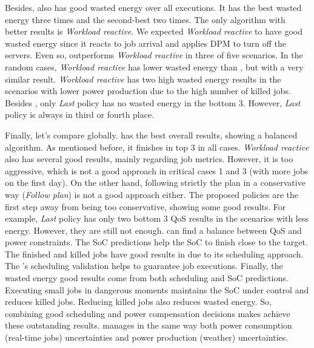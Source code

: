 Besides, \emph{\systemName} also has good wasted energy over all executions. It has the best wasted energy three times and the second-best two times. The only algorithm with better results is \emph{Workload reactive}. We expected \emph{Workload reactive} to have good wasted energy since it reacts to job arrival and applies DPM to turn off the servers. Even so, \emph{\systemName} outperforms \emph{Workload reactive} in three of five scenarios. In the random cases, \emph{Workload reactive} has lower wasted energy than \emph{\systemName}, but with a very similar result. \emph{Workload reactive} has two high wasted energy results in the scenarios with lower power production due to the high number of killed jobs. Besides \emph{\systemName}, only \emph{Last} policy has no wasted energy in the bottom 3. However, \emph{Last} policy is always in third or fourth place.

Finally, let's compare \emph{\systemName} globally. \emph{\systemName} has the best overall results, showing a balanced algorithm. As mentioned before, it finishes in top 3 in all cases. \emph{Workload reactive} also has several good results, mainly regarding job metrics. However, it is too aggressive, which is not a good approach in critical cases 1 and 3 (with more jobs on the first day). On the other hand, following strictly the plan in a conservative way (\emph{Follow plan}) is not a good approach either. The proposed policies are the first step away from being too conservative, showing some good results. For example, \emph{Last} policy has only two bottom 3 QoS results in the scenarios with less energy. However, they are still not enough. \emph{\systemName} can find a balance between QoS and power constraints. The SoC predictions help the SoC to finish close to the target. The finished and killed jobs have good results in \emph{\systemName} due to its scheduling approach. The \emph{\systemName}'s scheduling validation helps to guarantee job executions. Finally, the wasted energy good results come from both scheduling and SoC predictions. Executing small jobs in dangerous moments maintains the SoC under control and reduces killed jobs. Reducing killed jobs also reduces wasted energy. So, combining good scheduling and power compensation decisions makes \emph{\systemName} achieve these outstanding results. \emph{\systemName} manages in the same way both power consumption (real-time jobs) uncertainties and power production (weather) uncertainties.



